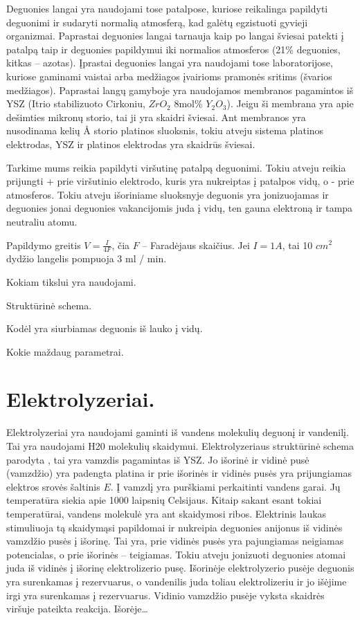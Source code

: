 Deguonies langai yra naudojami tose patalpose, kuriose reikalinga
papildyti deguonimi ir sudaryti normalią atmosferą, kad galėtų
egzistuoti gyvieji organizmai. Paprastai deguonies langai tarnauja
kaip po langai šviesai patekti į patalpą taip ir deguonies papildymui
iki normalios atmosferos (21\% deguonies, kitkas – azotas). Įprastai
deguonies langai yra naudojami tose laboratorijose, kuriose gaminami
vaistai arba medžiagos įvairioms pramonės sritims (švarios medžiagos).
Paprastai langų gamyboje yra naudojamos membranos pagamintos iš
YSZ (Itrio stabilizuoto Cirkoniu, $ZrO_{2}$ 8mol\% $Y_2O_{3}$). Jeigu
ši membrana yra apie dešimties mikronų storio, tai ji yra skaidri
šviesai. Ant membranos yra nusodinama kelių Å storio platinos sluoksnis,
tokiu atveju sistema platinos elektrodas, YSZ ir platinos elektrodas
yra skaidrūs šviesai.

 Tarkime mums reikia papildyti viršutinę patalpą deguonimi.
Tokiu atveju reikia prijungti + prie viršutinio elektrodo, kuris
yra nukreiptas į patalpos vidų, o - prie atmosferos. Tokiu atveju
išoriniame sluoksnyje deguonis yra jonizuojamas ir deguonies jonai
deguonies vakancijomis juda į vidų, ten gauna elektroną ir tampa
neutraliu atomu.

Papildymo greitis $V = \frac{I}{4F}$, čia $F$ – Faradėjaus skaičius.
Jei $I = 1A$, tai 10 $cm^{2}$  dydžio langelis pompuoja 3 ml / min.
\begin{remember}
  \item Kokiam tikslui yra naudojami.
  \item Struktūrinė schema.
  \item Kodėl yra siurbiamas deguonis iš lauko į vidų.
  \item Kokie maždaug parametrai.
\end{remember}

\section{Elektrolyzeriai.}

Elektrolyzeriai yra naudojami gaminti iš vandens molekulių deguonį
ir vandenilį. Tai yra naudojami H20 molekulių skaidymui. Elektrolyzeriaus
struktūrinė schema parodyta , tai yra vamzdis pagamintas
iš YSZ. Jo išorinė ir vidinė pusė (vamzdžio) yra padengta platina
ir prie išorinės ir vidinės pusės yra prijungiamas elektros srovės
šaltinis $E$. Į vamzdį yra purškiami perkaitinti vandens garai.
Jų temperatūra siekia apie 1000 laipsnių Celsijaus. Kitaip sakant
esant tokiai temperatūrai, vandens molekulė yra ant skaidymosi
ribos. Elektrinis laukas stimuliuoja tą skaidymąsi papildomai ir
nukreipia deguonies anijonus iš vidinės vamzdžio pusės į išorinę.
Tai yra, prie vidinės pusės yra pajungiamas neigiamas potencialas,
o prie išorinės – teigiamas. Tokiu atveju jonizuoti deguonies
atomai juda iš vidinės į išorinę elektrolizerio pusę. Išorinėje
elektrolyzerio pusėje deguonis yra surenkamas į rezervuarus, o 
vandenilis juda toliau elektrolizeriu ir jo išėjime irgi yra
surenkamas į rezervuarus. Vidinio vamzdžio pusėje vyksta skaidrės
viršuje pateikta reakcija. Išorėje…

